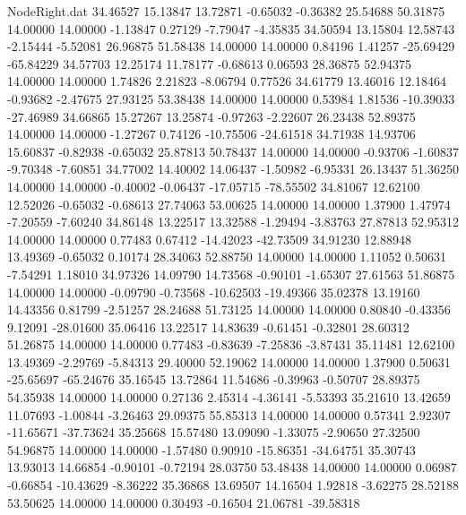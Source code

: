 \begin{filecontents}{NodeRight.dat}
  34.46527   15.13847   13.72871    -0.65032   -0.36382   25.54688   50.31875   14.00000   14.00000   -1.13847    0.27129   -7.79047   -4.35835
  34.50594   13.15804   12.58743    -2.15444   -5.52081   26.96875   51.58438   14.00000   14.00000    0.84196    1.41257  -25.69429  -65.84229
  34.57703   12.25174   11.78177    -0.68613    0.06593   28.36875   52.94375   14.00000   14.00000    1.74826    2.21823   -8.06794    0.77526
  34.61779   13.46016   12.18464    -0.93682   -2.47675   27.93125   53.38438   14.00000   14.00000    0.53984    1.81536  -10.39033  -27.46989
  34.66865   15.27267   13.25874    -0.97263   -2.22607   26.23438   52.89375   14.00000   14.00000   -1.27267    0.74126  -10.75506  -24.61518
  34.71938   14.93706   15.60837    -0.82938   -0.65032   25.87813   50.78437   14.00000   14.00000   -0.93706   -1.60837   -9.70348   -7.60851
  34.77002   14.40002   14.06437    -1.50982   -6.95331   26.13437   51.36250   14.00000   14.00000   -0.40002   -0.06437  -17.05715  -78.55502
  34.81067   12.62100   12.52026    -0.65032   -0.68613   27.74063   53.00625   14.00000   14.00000    1.37900    1.47974   -7.20559   -7.60240
  34.86148   13.22517   13.32588    -1.29494   -3.83763   27.87813   52.95312   14.00000   14.00000    0.77483    0.67412  -14.42023  -42.73509
  34.91230   12.88948   13.49369    -0.65032    0.10174   28.34063   52.88750   14.00000   14.00000    1.11052    0.50631   -7.54291    1.18010
  34.97326   14.09790   14.73568    -0.90101   -1.65307   27.61563   51.86875   14.00000   14.00000   -0.09790   -0.73568  -10.62503  -19.49366
  35.02378   13.19160   14.43356     0.81799   -2.51257   28.24688   51.73125   14.00000   14.00000    0.80840   -0.43356    9.12091  -28.01600
  35.06416   13.22517   14.83639    -0.61451   -0.32801   28.60312   51.26875   14.00000   14.00000    0.77483   -0.83639   -7.25836   -3.87431
  35.11481   12.62100   13.49369    -2.29769   -5.84313   29.40000   52.19062   14.00000   14.00000    1.37900    0.50631  -25.65697  -65.24676
  35.16545   13.72864   11.54686    -0.39963   -0.50707   28.89375   54.35938   14.00000   14.00000    0.27136    2.45314   -4.36141   -5.53393
  35.21610   13.42659   11.07693    -1.00844   -3.26463   29.09375   55.85313   14.00000   14.00000    0.57341    2.92307  -11.65671  -37.73624
  35.25668   15.57480   13.09090    -1.33075   -2.90650   27.32500   54.96875   14.00000   14.00000   -1.57480    0.90910  -15.86351  -34.64751
  35.30743   13.93013   14.66854    -0.90101   -0.72194   28.03750   53.48438   14.00000   14.00000    0.06987   -0.66854  -10.43629   -8.36222
  35.36868   13.69507   14.16504     1.92818   -3.62275   28.52188   53.50625   14.00000   14.00000    0.30493   -0.16504   21.06781  -39.58318

\end{filecontents}
